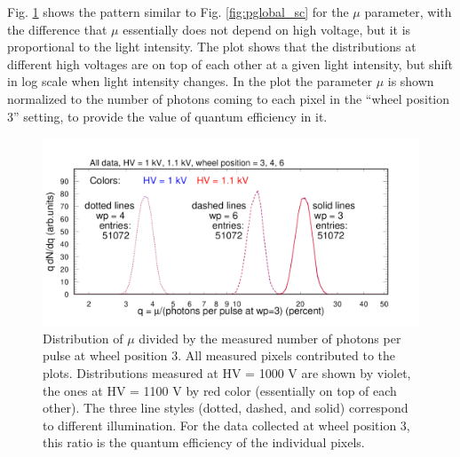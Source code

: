 Fig. \ref{fig:pglobal_qe_all} shows the pattern similar to Fig. \ref{fig:pglobal_sc} for the $\mu$ parameter, with the difference that $\mu$ essentially does not depend on high voltage, but it is proportional to the light intensity. The plot shows that the distributions at different high voltages are on top of each other at a given light intensity, but shift in log scale when light intensity changes. In the plot the parameter $\mu$ is shown normalized to the number of photons coming to each pixel in the ``wheel position 3'' setting, to provide the value of quantum efficiency in it. 
\begin{figure}[hbt]
	\centering
	\includegraphics[width=0.98\linewidth,trim=0 15 50 35,clip]{figures/pglobal_qe_all.pdf}
	\caption{Distribution of $\mu$ divided by the measured number of photons per pulse at wheel position 3. All measured pixels contributed to the plots. Distributions measured at HV = 1000 V are shown by violet, the ones at HV = 1100 V by red color (essentially on top of each other). The three line styles (dotted, dashed, and solid) correspond to different illumination. For the data collected at wheel position 3, this ratio is the quantum efficiency of the individual pixels.}
	\label{fig:pglobal_qe_all}
\end{figure}

